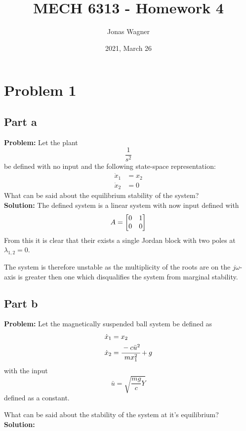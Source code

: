\documentclass[letter]{article}
\title{MECH 6313 - Homework 4}
\author{Jonas Wagner}
\date{2021, March 26}
\begin{document}
\maketitle


\section{Problem 1}

\subsection{Part a}
\textbf{Problem:}
Let the plant $$\frac{1}{s^2}$$ be defined with no input and the following state-space representation: 
\begin{equation}
	\begin{aligned}
		\dot{x}_1 &= x_2\\
		\dot{x}_2 &= 0
	\end{aligned}
\end{equation}
What can be said about the equilibrium stability of the system?\\

\noindent
\textbf{Solution:}
The defined system is a linear system with now input defined with $$A = \mqty[0&1\\0&0]$$
From this it is clear that their exists a single Jordan block with two poles at $\lambda_{1,2} = 0$.

The system is therefore unstable as the multiplicity of the roots are on the $j\omega$-axis is greater then one which disqualifies the system from marginal stability.

\newpage
\subsection{Part b}
\textbf{Problem:}
Let the magnetically suspended ball system be defined as
\begin{equation}
	\begin{aligned}
		\dot{x}_1 &= x_2\\
		\dot{x}_2 &= \cfrac{-c \bar{u}^2}{m x_1^2} + g
	\end{aligned}
\end{equation}
with the input $$\bar{u}= \sqrt{\frac{mg}{c}Y}$$ defined as a constant.

What can be said about the stability of the system at it's equilibrium?\\

\noindent
\textbf{Solution:}
\end{document}
